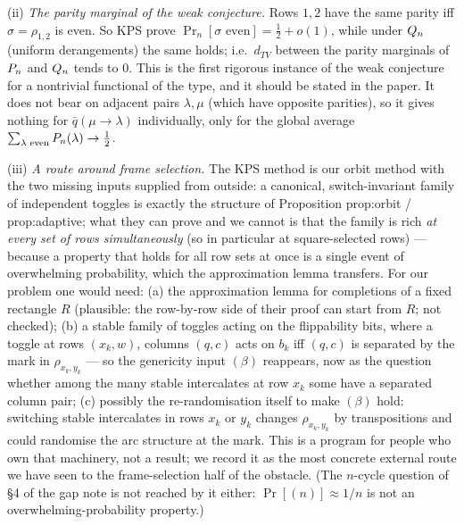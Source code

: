 (ii) \emph{The parity marginal of the weak conjecture.}  Rows $1,2$
have the same parity iff $\sigma=\rho_{1,2}$ is even.  So KPS prove
$\Pr_n[\sigma\text{ even}]=\tfrac12+o(1)$, while under $Q_n$ (uniform
derangements) the same holds; i.e.\ $d_{TV}$ between the parity
marginals of $P_n$ and $Q_n$ tends to $0$.  This is the first
rigorous instance of the weak conjecture for a nontrivial functional
of the type, and it should be stated in the paper.  It does not bear
on adjacent pairs $\lambda,\mu$ (which have opposite parities), so it
gives nothing for $\bar q(\mu\to\lambda)$ individually, only for the
global average $\sum_{\lambda\text{ even}}P_n(\lambda)\to\tfrac12$.

(iii) \emph{A route around frame selection.}  The KPS method is our
orbit method with the two missing inputs supplied from outside: a
canonical, switch-invariant family of independent toggles is exactly
the structure of Proposition prop:orbit / prop:adaptive; what they can
prove and we cannot is that the family is rich \emph{at every set of
rows simultaneously} (so in particular at square-selected rows) ---
because a property that holds for all row sets at once is a single
event of overwhelming probability, which the approximation lemma
transfers.  For our problem one would need: (a) the approximation lemma
for completions of a fixed rectangle $R$ (plausible: the row-by-row
side of their proof can start from $R$; not checked); (b) a stable
family of toggles acting on the flippability bits, where a toggle at
rows $(x_k,w)$, columns $(q,c)$ acts on $b_k$ iff $(q,c)$ is separated
by the mark in $\rho_{x_k,y_k}$ --- so the genericity input $(\beta)$
reappears, now as the question whether among the many stable
intercalates at row $x_k$ some have a separated column pair; (c)
possibly the re-randomisation itself to make $(\beta)$ hold: switching
stable intercalates in rows $x_k$ or $y_k$ changes $\rho_{x_k,y_k}$ by
transpositions and could randomise the arc structure at the mark.  This
is a program for people who own that machinery, not a result; we
record it as the most concrete external route we have seen to the
frame-selection half of the obstacle.  (The $n$-cycle question of \S4 of
the gap note is not reached by it either: $\Pr[(n)]\approx1/n$ is not
an overwhelming-probability property.)

